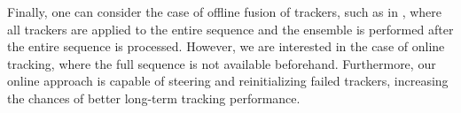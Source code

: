 
Finally, one can consider the case of offline fusion of trackers, such as in
\cite{Bailer2014}, where all trackers are applied to the entire sequence
and the ensemble is performed after the entire sequence is processed.
However, we are interested in the case of online tracking,
where the full sequence is not available beforehand. Furthermore, our online
approach is capable of steering and reinitializing failed trackers, increasing
the chances of better long-term tracking performance.


